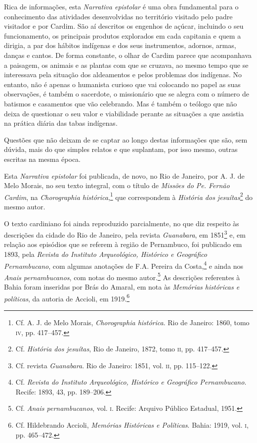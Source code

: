Rica de informações, esta \textit{Narrativa epistolar} é uma obra
fundamental para o conhecimento das atividades desenvolvidas no
território visitado pelo padre visitador e por Cardim. São aí
descritos os engenhos de açúcar, incluindo o seu funcionamento, os
principais produtos explorados em cada capitania e quem a dirigia, a
par dos hábitos indígenas e dos seus instrumentos, adornos, armas,
danças e cantos. De forma constante, o olhar de Cardim parece que
acompanhava a paisagem, os animais e as plantas com que se cruzava, ao
mesmo tempo que se interessava pela situação dos aldeamentos e pelos
problemas dos indígenas. No entanto, não é apenas o humanista curioso
que vai colocando no papel as suas observações, é também o sacerdote, o
missionário que se alegra com o número de batismos e casamentos que
vão celebrando. Mas é também o teólogo que não deixa de questionar o
seu valor e viabilidade perante as situações a que assistia na prática
diária das tabas indígenas.

Questões que não deixam de se captar ao longo destas informações que
são, sem dúvida, mais do que simples relatos e que suplantam, por isso
mesmo, outras escritas na mesma época. 

Esta \textit{Narrativa epistolar} foi publicada, de novo, no Rio de
Janeiro, por A. J. de Melo Morais, no seu texto integral, com o título
de \textit{Missões do Pe. Fernão Cardim}, na \textit{Chorographia
histórica},\footnote{ Cf. A. J. de Melo Morais,
\textit{Chorographia histórica}. Rio de Janeiro: 1860, tomo \textsc{iv}, 
pp. 417--457.} que correspondem à \textit{História dos jesuítas}\footnote{ Cf. \textit{História dos jesuítas}, Rio de Janeiro, 1872, 
tomo \textsc{ii}, pp. 417--457.} do mesmo autor. 

O texto cardiniano foi ainda reproduzido parcialmente, no que diz
respeito às descrições da cidade do Rio de Janeiro, pela revista
\textit{Guanabara}, em 1851\footnote{ Cf. revista
\textit{Guanabara}. Rio de Janeiro: 1851, vol. \textsc{ii}, pp. 115--122.} e, em
relação aos episódios que se referem à região de Pernambuco, foi
publicado em 1893, pela \textit{Revista do Instituto Arqueológico,
Histórico e Geográfico Pernambucano}, com algumas anotações de F.A.
Pereira da Costa,\footnote{ Cf. \textit{Revista do Instituto
Arqueológico, Histórico e Geográfico Pernambucano}. Recife: 1893, 43,
pp. 189--206.} e ainda nos \textit{Anais pernambucanos}, com
notas do mesmo autor.\footnote{ Cf. \textit{Anais pernambucanos}, 
vol. \textsc{i}. Recife: Arquivo Público Estadual, 1951.} As
descrições referentes à Bahia foram inseridas por Brás do Amaral, em
nota às \textit{Memórias históricas e políticas}, da autoria de
Accioli, em 1919.\footnote{ Cf. Hildebrando Accioli, 
\textit{Memórias Históricas e Políticas}. Bahia: 1919, vol. \textsc{i}, pp. 465--472.}

